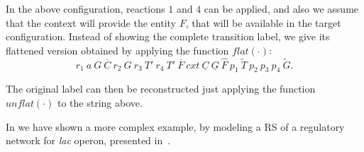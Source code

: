 In the above configuration, reactions $1$ and $4$ can be applied, and also we assume that the context will provide the entity $F$, that will be available in the target configuration.
Instead of showing the complete transition label, we give its flattened version obtained by applying the function $\mathit{flat}(\cdot)$:
\[
r_1~ a~G~\overline{C}~ r_2~ G~ r_3~T'~r_4~T'~\overline{F}~cxt~\underline{C}~\underline{G}~\widehat{F}~p_1~\widetilde{T}~p_2~p_3~p_4~\widetilde{G} .
\]

The original label can then be reconstructed just applying the function $\mathit{unflat}(\cdot)$ to the string above.

In \cite{BBF19} we have shown a more complex example, by modeling a RS 
of a regulatory network for \emph{lac} operon, 
presented in~\cite{CMMBM12}.


